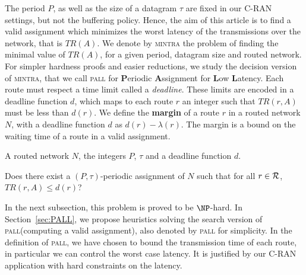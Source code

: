 \documentclass[a4paper,10pt]{journal}
\newcommand\pall{\textsc{pall}\xspace}
\newcommand\mintra{\textsc{mintra}\xspace}
\begin{document}
      	The period $P$, as well as the size of a datagram $\tau$ are fixed in our C-RAN settings, but not the buffering policy. Hence, the aim of this article is to find a valid assignment which minimizes the worst latency of the transmissions over the network, that is $TR(A)$. We denote by \mintra the problem of finding the minimal value of $TR(A)$, for a given period, datagram size and routed network.
      	For simpler hardness proofs and easier reductions, we study the decision version of \mintra, that we call \pall for \textbf{P}eriodic \textbf{A}ssignment for \textbf{L}ow \textbf{L}atency. Each route must respect a time limit called a \emph{deadline}. These limits are encoded in a deadline function $d$, which maps to each route $r$ an integer such that $TR(r,A)$ must be less than $d(r)$.
      	We define the \textbf{margin} of a route $r$ in a routed network $N$, with a deadline function $d$ as 
        $ d(r) - \lambda(r)$. The margin is a bound on the waiting time of a route in a valid assignment.

     \bigskip


        A routed network $N$, the integers $P$, $\tau$ and a deadline function $d$.
      
       Does there exist a $(P,\tau)$-periodic assignment of $N$ such that for all $r \in {\cal R}$, $TR(r,A) \leq d(r)$?
      \bigskip

	  In the next subsection, this problem is proved to be $\NP$-hard. In Section~\ref{sec:PALL}, we propose heuristics solving the search version of \pall (computing a valid assignment), also denoted by \pall for simplicity. In the definition of \pall, we have chosen to bound the transmission time of each route, in particular we can control the worst case latency. It is justified by our C-RAN application with hard constraints on the latency. 
\end{document}
